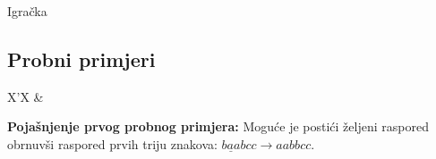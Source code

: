 \begin{statement}[
  problempoints=100,
  timelimit=1 sekunda,
  memorylimit=512 MiB,
]{Igračka}
\subsection*{Probni primjeri}
\begin{tabularx}{\textwidth}{X'X}
 &
\end{tabularx}

\textbf{Pojašnjenje prvog probnog primjera:}
Moguće je postići željeni raspored obrnuvši raspored prvih triju znakova:
$\underline{baa}bcc \rightarrow aabbcc$.

\end{statement}

